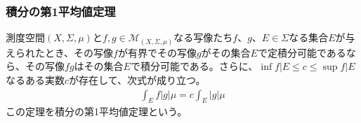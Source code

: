 \documentclass[dvipdfmx]{jsarticle}
\begin{document}
\subsubsection{積分の第1平均値定理}%
\begin{thm}\label{4.6.1.33}
測度空間$(X,\varSigma,\mu)$と$f,g \in \mathcal{M}_{(X,\varSigma,\mu)}$なる写像たち$f$、$g$、$E \in \varSigma$なる集合$E$が与えられたとき、その写像$f$が有界でその写像$g$がその集合$E$で定積分可能であるなら、その写像$fg$はその集合$E$で積分可能である。さらに、$\inf{f|E} \leq c \leq \sup{f|E}$なるある実数$c$が存在して、次式が成り立つ。
\begin{align*}
\int_{E} {f|g|\mu} = c\int_{E} {|g|\mu}
\end{align*}
この定理を積分の第1平均値定理という。
\end{thm}
\end{document}
